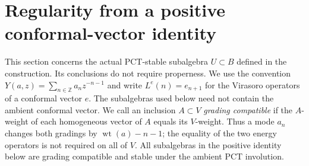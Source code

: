 
\section{Regularity from a positive conformal-vector identity}
\label{sec:regularity}

This section concerns the actual PCT-stable subalgebra $U\subset B$ defined
in the construction. Its conclusions do not require properness. We use
the convention $Y(a,z)=\sum_{n\in\mathbb Z}a_nz^{-n-1}$ and write
$L^e(n)=e_{n+1}$ for the Virasoro operators of a conformal vector $e$.
The subalgebras used below need not contain the ambient conformal vector.
We call an inclusion $A\subset V$ \emph{grading compatible} if the
$A$-weight of each homogeneous vector of $A$ equals its $V$-weight.
Thus a mode $a_n$ changes both gradings by $\operatorname{wt}(a)-n-1$;
the equality of the two energy operators is not required on all of $V$.
All subalgebras in the positive identity below are grading compatible
and stable under the ambient PCT involution.

